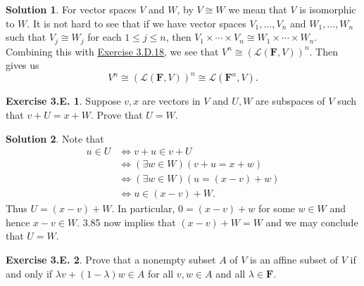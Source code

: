 \documentclass[12pt]{article}
\theoremstyle{definition}
\theoremstyle{exercise}
\newtheorem{exercise}{Exercise 3.E.}
\theoremstyle{solution}
\newtheorem*{solution}{Solution}
\newcommand{\lmap}{\mathcal{L}}
\newcommand{\F}{\mathbf{F}}
\begin{document}
\begin{solution}
    For vector spaces \( V \) and \( W \), by \( V \cong W \) we mean that \( V \) is isomorphic to \( W \). It is not hard to see that if we have vector spaces \( V_1, \ldots, V_n \) and \( W_1, \ldots, W_n \) such that \( V_j \cong W_j \) for each \( 1 \leq j \leq n \), then \( V_1 \times \cdots \times V_n \cong W_1 \times \cdots \times W_n \). Combining this with \href{https://lew98.github.io/Mathematics/LADR_Section_3_D_Exercises.pdf}{Exercise 3.D.18}, we see that \( V^n \cong (\lmap(\F, V))^n \). Then  gives us
    \[
        V^n \cong (\lmap(\F, V))^n \cong \lmap(\F^n, V).
    \]
\end{solution}

\begin{exercise}
\label{ex:7}
    Suppose \( v, x \) are vectors in \( V \) and \( U, W \) are subspaces of \( V \) such that \( v + U = x + W \). Prove that \( U = W \).
\end{exercise}

\begin{solution}
    Note that
    \begin{align*}
        u \in U &\iff v + u \in v + U \\
        &\iff (\exists w \in W)(v + u = x + w) \\
        &\iff (\exists w \in W)(u = (x - v) + w) \\
        &\iff u \in (x - v) + W.
    \end{align*}
    Thus \( U = (x - v) + W \). In particular, \( 0 = (x - v) + w \) for some \( w \in W \) and hence \( x - v \in W \). 3.85 now implies that \( (x - v) + W = W \) and we may conclude that \( U = W \).
\end{solution}

\begin{exercise}
\label{ex:8}
    Prove that a nonempty subset \( A \) of \( V \) is an affine subset of \( V \) if and only if \( \lambda v + (1 - \lambda) w \in A \) for all \( v, w \in A \) and all \( \lambda \in \F \).
\end{exercise}
\end{document}
